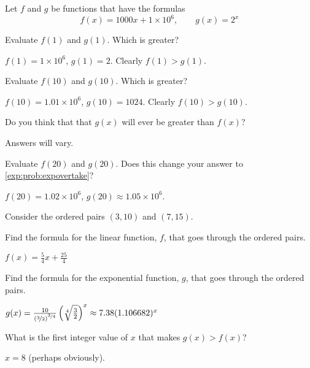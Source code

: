 \begin{exercises}
			
\begin{problem}
Let $f$ and $g$ be functions that have the formulas
\[
	f(x)=1000x+1\times 10^6,\qquad  g(x)=2^x
\]
\begin{subproblem}
	Evaluate $f(1)$ and $g(1)$. Which is greater?
	\begin{shortsolution}
		$f(1)=1\times 10^6$, $g(1)=2$. Clearly $f(1)>g(1)$.
	\end{shortsolution}
\end{subproblem}
\begin{subproblem}
	Evaluate $f(10)$ and $g(10)$. Which is greater?
	\begin{shortsolution}
		$f(10)=1.01\times 10^6$, $g(10)=1024$. Clearly $f(10)>g(10)$.
	\end{shortsolution}
\end{subproblem}
\begin{subproblem}\label{exp:prob:expovertake}
	Do you think that that $g(x)$ will ever be greater than $f(x)$?
	\begin{shortsolution}
		Answers will vary.
	\end{shortsolution}
\end{subproblem}
\begin{subproblem}
	Evaluate $f(20)$ and $g(20)$. Does this change your answer to \cref{exp:prob:expovertake}?
	\begin{shortsolution}
		$f(20)=1.02\times 10^6$, $g(20)\approx 1.05\times 10^6$. 
	\end{shortsolution}
\end{subproblem}
\end{problem}
			
\begin{problem}
Consider the ordered pairs $(3,10)$ and $(7,15)$.
\begin{subproblem}
	Find the formula for the linear function, $f$, that goes through the ordered pairs.
	\begin{shortsolution}
		$f(x)=\frac{5}{4}x+\frac{25}{4}$
	\end{shortsolution}
\end{subproblem}
\begin{subproblem}
	Find the formula for the exponential function, $g$, that goes through the ordered pairs.
	\begin{shortsolution}
		$g(x)=\frac{10}{\left( \nicefrac{3}{2} \right)^{\nicefrac{3}{4}}}\left( \sqrt[4]{\frac{3}{2}} \right)^x\approx 7.38(1.106682)^x$
	\end{shortsolution}
\end{subproblem}
\begin{subproblem}
	What is the first integer value of $x$ that makes $g(x)>f(x)$?
	\begin{shortsolution}
		$x=8$ (perhaps obviously).
	\end{shortsolution}
\end{subproblem}
\end{problem}
			

\end{exercises}
